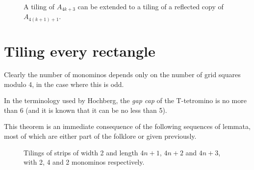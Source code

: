 \documentclass{article}
\theoremstyle{plain}
\begin{document}
\begin{figure}

\caption{A tiling of $A_{4k+3}$ can be extended to a tiling of a reflected copy of $A_{4(k+1)+1}$.}
\label{threes}
\end{figure}

\section{Tiling every rectangle}
Clearly the number of monominos depends only on the number of grid squares modulo 4, in the case where this is odd.

In the terminology used by Hochberg, the \emph{gap cap} of the T-tetromino is no more than 6 (and it is known that it can be no less than 5).

This theorem is an immediate consequence of the following sequences of lemmata, most of which are either part of the folklore or given previously.

\begin{figure}

\caption{Tilings of strips of width 2 and length $4n + 1$, $4n+2$ and $4n+3$, with 2, 4 and 2 monominos respectively.}
\label{strips}
\end{figure}

{}

\end{document}
